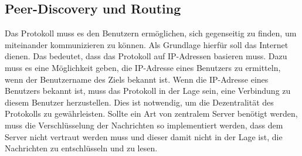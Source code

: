 \subsection{Peer-Discovery und Routing}
\label{subsec:peer_discovery}

Das Protokoll muss es den Benutzern ermöglichen, sich gegenseitig zu finden, um miteinander kommunizieren zu können. Als Grundlage hierfür soll das Internet dienen. Das bedeutet, dass das Protokoll auf IP-Adressen basieren muss. Dazu muss es eine Möglichkeit geben, die IP-Adresse eines Benutzers zu ermitteln, wenn der Benutzername des Ziels bekannt ist. Wenn die IP-Adresse eines Benutzers bekannt ist, muss das Protokoll in der Lage sein, eine Verbindung zu diesem Benutzer herzustellen. Dies ist notwendig, um die Dezentralität des Protokolls zu gewährleisten. Sollte ein Art von zentralem Server benötigt werden, muss die Verschlüsselung der Nachrichten so implementiert werden, dass dem Server nicht vertraut werden muss und dieser damit nicht in der Lage ist, die Nachrichten zu entschlüsseln und zu lesen.